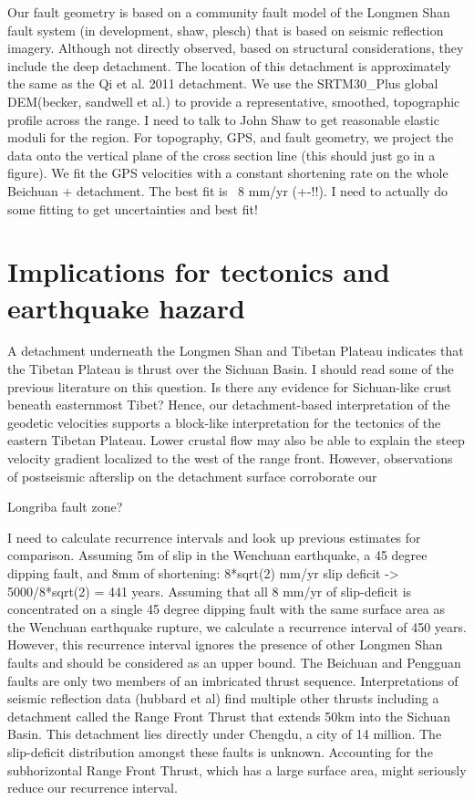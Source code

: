 \documentclass{article}
\begin{document}
Our fault geometry is based on a community fault model of the Longmen Shan fault system (in development, shaw, plesch) that is based on seismic reflection imagery.
Although not directly observed, based on structural considerations, they include the deep detachment.
The location of this detachment is approximately the same as the Qi et al. 2011 detachment. We use the SRTM30\_Plus global DEM(becker, sandwell et al.)  to provide a representative, smoothed, topographic profile across the range. 
I need to talk to John Shaw to get reasonable elastic moduli for the region.
For topography, GPS, and fault geometry, we project the data onto the vertical plane of the cross section line (this should just go in a figure).
We fit the GPS velocities with a constant shortening rate on the whole Beichuan + detachment. The best fit is ~8 mm/yr (+-!!). 
I need to actually do some fitting to get uncertainties and best fit!

\section{Implications for tectonics and earthquake hazard}
A detachment underneath the Longmen Shan and Tibetan Plateau indicates that the Tibetan Plateau is thrust over the Sichuan Basin. I should read some of the previous literature on this question. Is there any evidence for Sichuan-like crust beneath easternmost Tibet? 
Hence, our detachment-based interpretation of the geodetic velocities supports a block-like interpretation for the tectonics of the eastern Tibetan Plateau. Lower crustal flow may also be able to explain the steep velocity gradient localized to the west of the range front. However, observations of postseismic afterslip on the detachment surface corroborate our  

Longriba fault zone?

I need to calculate recurrence intervals and look up previous estimates for comparison. 
Assuming 5m of slip in the Wenchuan earthquake, a 45 degree dipping fault, and 8mm of shortening: 8*sqrt(2) mm/yr slip deficit -> 5000/8*sqrt(2) = 441 years.
Assuming that all 8 mm/yr of slip-deficit is concentrated on a single 45 degree dipping fault with the same surface area as the Wenchuan earthquake rupture, we calculate a recurrence interval of 450 years.
However, this recurrence interval ignores the presence of other Longmen Shan faults and should be considered as an upper bound. The Beichuan and Pengguan faults are only two members of an imbricated thrust sequence. Interpretations of seismic reflection data (hubbard et al) find multiple other thrusts including a detachment called the Range Front Thrust that extends 50km into the Sichuan Basin. This detachment lies directly under Chengdu, a city of 14 million. The slip-deficit distribution amongst these faults is unknown. Accounting for the subhorizontal Range Front Thrust, which has a large surface area, might seriously reduce our recurrence interval.
\end{document}
